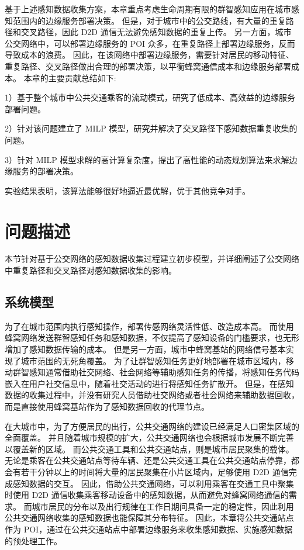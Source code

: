 基于上述感知数据收集方案，本章重点考虑生命周期有限的群智感知应用在城市感知范围内的边缘服务部署决策。
但是，对于城市中的公交路线，有大量的重复路径和交叉路径，因此 D2D 通信无法避免感知数据的重复上传。
另一方面，城市公交网络中，可以部署边缘服务的 POI 众多，在重复路径上部署边缘服务，反而导致成本的浪费。
因此，在该网络中部署边缘服务，需要针对居民的移动特征、重复路径、交叉路径做出合理的部署决策，以平衡蜂窝通信成本和边缘服务部署成本。
本章的主要贡献总结如下:

1）基于整个城市中公共交通乘客的流动模式，研究了低成本、高效益的边缘服务部署问题。

2）针对该问题建立了 MILP 模型，研究并解决了交叉路径下感知数据重复收集的问题。

3）针对 MILP 模型求解的高计算复杂度，提出了高性能的动态规划算法来求解边缘服务的部署决策。

实验结果表明，该算法能够很好地逼近最优解，优于其他竞争对手。



\section{问题描述}
\label{Sec_Monet_question}

本节针对基于公交网络的感知数据收集过程建立初步模型，并详细阐述了公交网络中重复路径和交叉路径对感知数据收集的影响。

\subsection{系统模型}

为了在城市范围内执行感知操作，部署传感网络灵活性低、改造成本高。
而使用蜂窝网络发送群智感知任务和感知数据，不仅提高了感知设备的门槛要求，也无形增加了感知数据传输的成本。
但是另一方面，城市中蜂窝基站的网络信号基本实现了城市范围的无死角覆盖。
为了让群智感知任务更好地部署在城市区域内，移动群智感知通常借助社交网络、社会网络等辅助感知任务的传播，将感知任务代码嵌入在用户社交信息中，随着社交活动的进行将感知任务扩散开。
但是，在感知数据的收集过程中，并没有研究人员借助社交网络或者社会网络来辅助数据回收，而是直接使用蜂窝基站作为了感知数据回收的代理节点。

在大城市中，为了方便居民的出行，公共交通网络的建设已经满足人口密集区域的全面覆盖。
并且随着城市规模的扩大，公共交通网络也会根据城市发展不断完善以覆盖新的区域。
而公共交通工具和公共交通站点，则是城市居民聚集的载体。
无论是乘客在公共交通站点等待车辆、还是公共交通工具在公共交通站点停靠，都会有若干分钟以上的时间将大量的居民聚集在小片区域内，足够使用 D2D 通信完成感知数据的交互。
因此，借助公共交通网络，可以利用乘客在交通工具中聚集时使用 D2D 通信收集乘客移动设备中的感知数据，从而避免对蜂窝网络通信的需求。
而城市居民的分布以及出行规律在工作日期间具备一定的稳定性，因此利用公共交通网络收集的感知数据也能保障其分布特征。
因此，本章将公共交通站点作为 POI，通过在公共交通站点中部署边缘服务来收集感知数据、实施感知数据的预处理工作。

